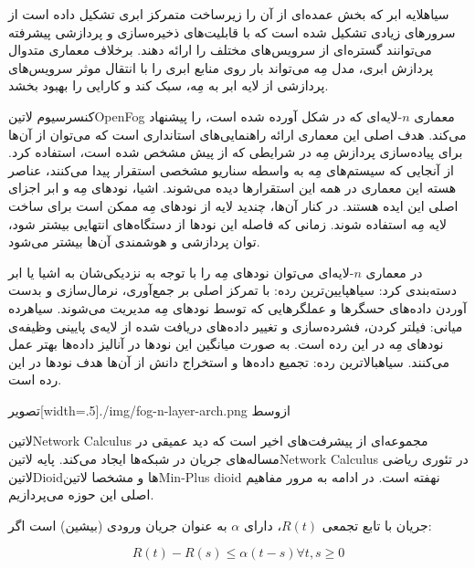 ‌سیاه{لایه ابر} که بخش عمده‌ای از آن را زیرساخت متمرکز ابری تشکیل داده است از سرورهای زیادی تشکیل شده است که با قابلیت‌های ذخیره‌سازی و پردازشی
پیشرفته می‌توانند گستره‌ای از سرویس‌های مختلف را ارائه دهند. برخلاف معماری متدوال پردازش ابری، مدل مِه می‌تواند بار روی منابع ابری را با انتقال موثر سرویس‌های پردازشی
از لایه ابر به مِه، سبک کند و کارایی را بهبود بخشد.

کنسرسیوم ‌لاتین{OpenFog} معماری $n$-لایه‌ای که در شکل  آورده شده است، را پیشنهاد می‌کند.
هدف اصلی این معماری ارائه راهنمایی‌های استانداری است که می‌توان از آن‌ها برای پیاده‌سازی پردازش مِه در شرایطی که از پیش مشخص شده است، استفاده کرد.
از آنجایی که سیستم‌های مِه به واسطه سناریو مشخصی استقرار پیدا می‌کنند، عناصر هسته این معماری در همه این استقرارها دیده می‌شوند.
اشیا، نودهای مِه و ابر اجزای اصلی این ایده هستند. در کنار آن‌ها، چندید لایه از نودهای مِه ممکن است برای ساخت لایه مِه استفاده شوند.
زمانی که فاصله این نودها از دستگاه‌های انتهایی بیشتر شود، توان پردازشی و هوشمندی آن‌ها بیشتر می‌شود.

در معماری $n$-لایه‌ای می‌توان نودهای مِه را با توجه به نزدیکی‌شان به اشیا یا ابر دسته‌بندی کرد:
 ‌سیاه{پایین‌ترین رده}: با تمرکز اصلی بر جمع‌آوری، نرمال‌سازی و بدست آوردن داده‌های حسگرها و عملگرهایی که توسط نودهای مِه مدیریت می‌شوند.
 ‌سیاه{رده میانی}: فیلتر کردن، فشرده‌سازی و تغییر داده‌های دریافت شده از لایه‌ی پایینی وظیفه‌ی نودهای مِه در این رده است. به صورت میانگین
این نودها در آنالیز داده‌ها بهتر عمل می‌کنند.
 ‌سیاه{بالاترین رده}: تجمیع داده‌ها و استخراج دانش از آن‌ها هدف نودها در این رده است.

‌تصویر[width=.5\textwidth]{./img/fog-n-layer-arch.png}
‌ازوسط


‌لاتین{Network Calculus} مجموعه‌ای از پیشرفت‌های اخیر است که دید عمیقی در مساله‌های جریان در شبکه‌ها ایجاد می‌کند. پایه ‌لاتین{Network Calculus} در تئوری ریاضی ‌لاتین{Dioid}ها و مشخصا ‌لاتین{Min-Plus dioid} نهفته است.
در ادامه به مرور مفاهیم اصلی این حوزه می‌پردازیم.


جریان با تابع تجمعی $R(t)$، دارای $\alpha$ به عنوان جریان ورودی (بیشین) است اگر:

\[
  R(t) - R(s) \le \alpha(t - s) \forall t,s \ge 0
\]

